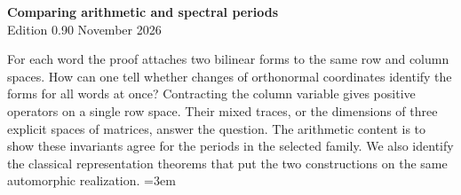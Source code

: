 \begin{center}
{\Large\bfseries Comparing arithmetic and spectral periods}\\[4pt]
Edition 0.90  November 2026
\end{center}

For each word the proof attaches two bilinear forms to the same row
and column spaces. How can one tell whether changes of orthonormal
coordinates identify the forms for all words at once? Contracting the
column variable gives positive operators on a single row space. Their
mixed traces, or the dimensions of three explicit spaces of matrices,
answer the question. The arithmetic content is to show these invariants
agree for the periods in the selected family. We also identify the
classical representation theorems that put the two constructions on
the same automorphic realization.
\begingroup\emergencystretch=3em






\endgroup
